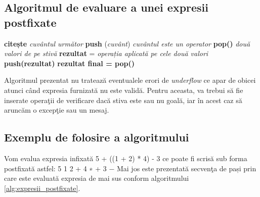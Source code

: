\subsection{Algoritmul de evaluare a unei expresii postfixate}

\begin{algorithm} [H]
	\caption{}\label{alg:expresii_postfixate}
	\begin{algorithmic}[1]
		\State \textbf{citește} \textit{cuvântul următor}	
		\State \textbf{push} (\textit{cuvânt})	
		\Else \textit{ cuvântul este un operator}
		\State \textbf{pop()} \textit{două valori de pe stivă}
		\State \textbf{rezultat} = \textit{operația aplicată pe cele două valori}
		\State \textbf{push(rezultat)}
		\EndIf		
		\EndWhile
		\State \textbf{rezultat final = pop()}			
	\end{algorithmic}
\end{algorithm}

Algoritmul prezentat nu tratează eventualele erori de \textit{underflow} ce apar de obicei atunci când expresia furnizată nu este validă. Pentru aceasta, va trebui să fie inserate operaţii de verificare dacă stiva este sau nu goală, iar în acest caz să aruncăm o excepţie sau un mesaj.

\subsection{Exemplu de folosire a algoritmului}

Vom evalua expresia infixată 5 + ((1 + 2) * 4) - 3 ce poate fi scrisă sub forma
postfixată astfel:
 5 1 2 + 4 ∗ + 3 −
Mai jos este prezentată secvenţa de pași prin care este evaluată expresia de mai sus
conform algoritmului \ref{alg:expresii_postfixate}.
